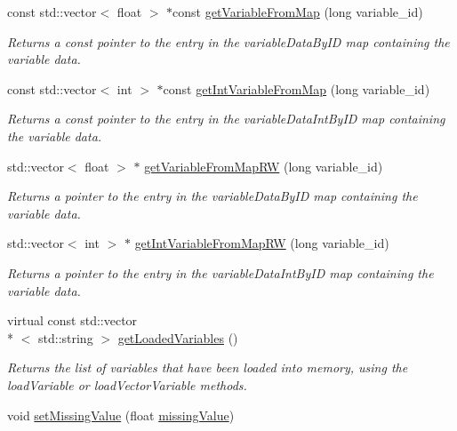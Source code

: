 \begin{DoxyCompactItemize}
const std\-::vector$<$ float $>$ $\ast$const \hyperlink{classccmc_1_1_model_adfc74a4905762247f2ee5b6a74d1d107}{get\-Variable\-From\-Map} (long variable\-\_\-id)
\begin{DoxyCompactList}\small\item\em Returns a const pointer to the entry in the variable\-Data\-By\-I\-D map containing the variable data. \end{DoxyCompactList}\item 
const std\-::vector$<$ int $>$ $\ast$const \hyperlink{classccmc_1_1_model_a6e4c1576e63741d535e06f30c19b6a8b}{get\-Int\-Variable\-From\-Map} (long variable\-\_\-id)
\begin{DoxyCompactList}\small\item\em Returns a const pointer to the entry in the variable\-Data\-Int\-By\-I\-D map containing the variable data. \end{DoxyCompactList}\item 
std\-::vector$<$ float $>$ $\ast$ \hyperlink{classccmc_1_1_model_a4479c4d2ef1014452d91ba055d16abd2}{get\-Variable\-From\-Map\-R\-W} (long variable\-\_\-id)
\begin{DoxyCompactList}\small\item\em Returns a pointer to the entry in the variable\-Data\-By\-I\-D map containing the variable data. \end{DoxyCompactList}\item 
std\-::vector$<$ int $>$ $\ast$ \hyperlink{classccmc_1_1_model_aece24ca9849cebe22461c32eb6051d44}{get\-Int\-Variable\-From\-Map\-R\-W} (long variable\-\_\-id)
\begin{DoxyCompactList}\small\item\em Returns a pointer to the entry in the variable\-Data\-Int\-By\-I\-D map containing the variable data. \end{DoxyCompactList}\item 
virtual const std\-::vector\\*
$<$ std\-::string $>$ \hyperlink{classccmc_1_1_model_ac49a0eec99d25e9ed08ffff959e4ecdc}{get\-Loaded\-Variables} ()
\begin{DoxyCompactList}\small\item\em Returns the list of variables that have been loaded into memory, using the load\-Variable or load\-Vector\-Variable methods. \end{DoxyCompactList}\item 
void \hyperlink{classccmc_1_1_model_a45b6caeedf03832524c1ee4577eb31b2}{set\-Missing\-Value} (float \hyperlink{classccmc_1_1_model_ae18cabca92352739be2b97f0ee973475}{missing\-Value})

\end{DoxyCompactItemize}
